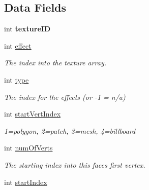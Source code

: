 \subsection*{Data Fields}
\begin{DoxyCompactItemize}
\item 
int {\bfseries texture\+ID}\hypertarget{structt_b_s_p_face_a955fc96bb7b647ea7272603dce12cec8}{}\label{structt_b_s_p_face_a955fc96bb7b647ea7272603dce12cec8}

\item 
int \hyperlink{structt_b_s_p_face_af81d0807937a348a1a6bed5a489afd17}{effect}\hypertarget{structt_b_s_p_face_af81d0807937a348a1a6bed5a489afd17}{}\label{structt_b_s_p_face_af81d0807937a348a1a6bed5a489afd17}

\begin{DoxyCompactList}\small\item\em The index into the texture array. \end{DoxyCompactList}\item 
int \hyperlink{structt_b_s_p_face_a040c921d8119084211d7c5b598e50d8c}{type}\hypertarget{structt_b_s_p_face_a040c921d8119084211d7c5b598e50d8c}{}\label{structt_b_s_p_face_a040c921d8119084211d7c5b598e50d8c}

\begin{DoxyCompactList}\small\item\em The index for the effects (or -\/1 = n/a) \end{DoxyCompactList}\item 
int \hyperlink{structt_b_s_p_face_a21d59300888f6b9b19c7ababcf3a0ebf}{start\+Vert\+Index}\hypertarget{structt_b_s_p_face_a21d59300888f6b9b19c7ababcf3a0ebf}{}\label{structt_b_s_p_face_a21d59300888f6b9b19c7ababcf3a0ebf}

\begin{DoxyCompactList}\small\item\em 1=polygon, 2=patch, 3=mesh, 4=billboard \end{DoxyCompactList}\item 
int \hyperlink{structt_b_s_p_face_a1912406bb5b51899b39f9f2df91dcf23}{num\+Of\+Verts}\hypertarget{structt_b_s_p_face_a1912406bb5b51899b39f9f2df91dcf23}{}\label{structt_b_s_p_face_a1912406bb5b51899b39f9f2df91dcf23}

\begin{DoxyCompactList}\small\item\em The starting index into this face\textquotesingle{}s first vertex. \end{DoxyCompactList}\item 
int \hyperlink{structt_b_s_p_face_ac637580cbe83702a142979852429e10f}{start\+Index}\hypertarget{structt_b_s_p_face_ac637580cbe83702a142979852429e10f}{}\label{structt_b_s_p_face_ac637580cbe83702a142979852429e10f}


\end{DoxyCompactItemize}
